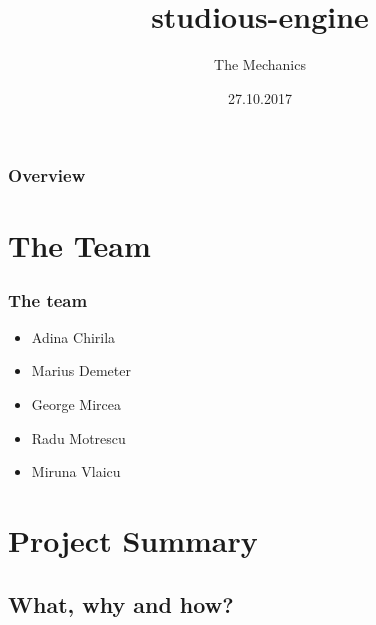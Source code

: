 \documentclass{beamer}
\title[studious-engine]{studious-engine} %
\author{The Mechanics} %
\date{27.10.2017} %
\begin{document}
\begin{frame}
\titlepage %
\end{frame}

\begin{frame}
\frametitle{Overview} %
\tableofcontents %
\end{frame}



\section{The Team} %

\begin{frame}
\frametitle{The team}
\begin{itemize}
\item Adina Chirila
\item Marius Demeter
\item George Mircea
\item Radu Motrescu
\item Miruna Vlaicu
\end{itemize}
\end{frame}


\section{Project Summary}

\subsection{What, why and how?}
\end{document}

